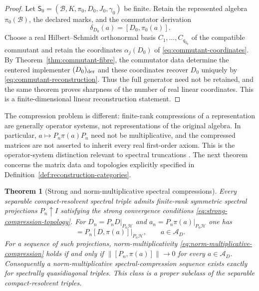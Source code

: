 \documentclass[11pt]{article}
\newtheorem{theorem}{Theorem}[section]
\theoremstyle{definition}
\theoremstyle{remark}
\theoremstyle{definition}
\theoremstyle{remark}
\newcommand{\A}{\mathcal A}
\newcommand{\Hh}{\mathcal H}
\begin{document}
\begin{proof}
Let
$\mathsf S_0=(\mathcal B,K,\pi_0,D_0,J_0,\gamma_0)$ be finite.  Retain the
represented algebra $\pi_0(\mathcal B)$, the declared marks, and the commutator
derivation
\[
 \delta_{D_0}(a)=[D_0,\pi_0(a)].
\]
Choose a real Hilbert--Schmidt orthonormal basis
$C_1,\ldots,C_{q_{\mathsf S_0}}$ of the compatible commutant and retain the
coordinates $\alpha_j(D_0)$ of \eqref{eq:commutant-coordinates}.  By
Theorem~\ref{thm:commutant-fibre}, the commutator data determine the centered
implementer $(D_0)_{\rm der}$ and these coordinates recover $D_0$ uniquely by
\eqref{eq:commutant-reconstruction}.  Thus the full generator need not be retained,
and the same theorem proves sharpness of the number of real linear coordinates.
This is a finite-dimensional linear reconstruction statement.
\end{proof}

The compression problem is different: finite-rank compressions of a representation
are generally operator systems, not representations of the original algebra.
In particular, $a\mapsto P_n\pi(a)P_n$ need not be multiplicative, and the compressed
matrices are not asserted to inherit every real first-order axiom.  This is the
operator-system distinction relevant to spectral truncations
\cite{vanSuijlekom2021,Leimbach2025}.  The next theorem concerns the matrix data and
topologies explicitly specified in Definition~\ref{def:reconstruction-categories}.

\begin{theorem}[Strong and norm-multiplicative spectral compressions]
\label{thm:spectral-compressions}
Every separable compact-resolvent spectral triple admits finite-rank symmetric
spectral projections $P_n\uparrow I$ satisfying the strong convergence conditions
\eqref{eq:strong-compression-topology}.  For
$D_n=P_nD|_{P_n\Hh}$ and $a_n=P_n\pi(a)|_{P_n\Hh}$ one has
\begin{equation}
 [D_n,a_n]=P_n[D,\pi(a)]|_{P_n\Hh},\qquad a\in\A_D.
 \label{eq:compressed-commutator-identity}
\end{equation}
For a sequence of such projections, norm-multiplicativity
\eqref{eq:norm-multiplicative-compression} holds if and only if
$\|[P_n,\pi(a)]\|\to0$ for every $a\in\A_D$.  Consequently a
norm-multiplicative spectral-compression sequence exists exactly for spectrally
quasidiagonal triples.  This class is a proper subclass of the separable
compact-resolvent triples.
\end{theorem}
\end{document}
